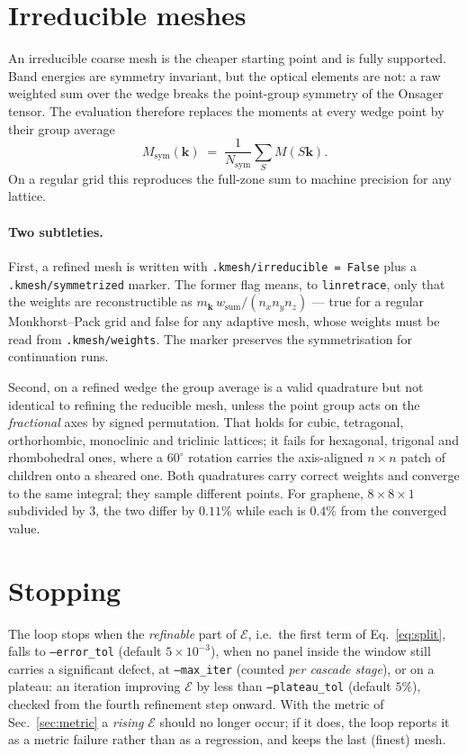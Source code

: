 \documentclass[11pt,a4paper]{article}
\newcommand{\kk}{\mathbf{k}}
\newcommand{\code}[1]{\texttt{#1}}
\begin{document}
\section{Irreducible meshes}

An irreducible coarse mesh is the cheaper starting point and is fully
supported. Band energies are symmetry invariant, but the optical elements are
not: a raw weighted sum over the wedge breaks the point-group symmetry of the
Onsager tensor. The evaluation therefore replaces the moments at every wedge
point by their group average
\begin{equation}
  M_\text{sym}(\kk) \;=\; \frac{1}{N_\text{sym}}
    \sum_{S} M\!\left(S\kk\right).
\end{equation}
On a regular grid this reproduces the full-zone sum to machine precision for
any lattice.

\paragraph{Two subtleties.}
First, a refined mesh is written with \code{.kmesh/irreducible = False} plus a
\code{.kmesh/symmetrized} marker. The former flag means, to
\code{linretrace}, only that the weights are reconstructible as
$m_{\kk}\,w_\text{sum}/(n_x n_y n_z)$ --- true for a regular Monkhorst--Pack
grid and false for any adaptive mesh, whose weights must be read from
\code{.kmesh/weights}. The marker preserves the symmetrisation for
continuation runs.

Second, on a refined wedge the group average is a valid quadrature but not
identical to refining the reducible mesh, unless the point group acts on the
\emph{fractional} axes by signed permutation. That holds for cubic,
tetragonal, orthorhombic, monoclinic and triclinic lattices; it fails for
hexagonal, trigonal and rhombohedral ones, where a $60^\circ$ rotation carries
the axis-aligned $n\times n$ patch of children onto a sheared one. Both
quadratures carry correct weights and converge to the same integral; they
sample different points. For graphene, $8\times8\times1$ subdivided by 3, the
two differ by $0.11\%$ while each is $0.4\%$ from the converged value.

\section{Stopping}

The loop stops when the \emph{refinable} part of $\mathcal{E}$, i.e.\ the first
term of Eq.~\eqref{eq:split}, falls to \code{--error\_tol} (default
$5\times10^{-3}$), when no panel inside the window still carries a significant
defect, at \code{--max\_iter} (counted \emph{per cascade stage}), or on a
plateau: an iteration improving
$\mathcal{E}$ by less than \code{--plateau\_tol} (default $5\%$), checked from
the fourth refinement step onward. With the metric of
Sec.~\ref{sec:metric} a \emph{rising} $\mathcal{E}$ should no longer occur; if
it does, the loop reports it as a metric failure rather than as a regression,
and keeps the last (finest) mesh.
\end{document}
